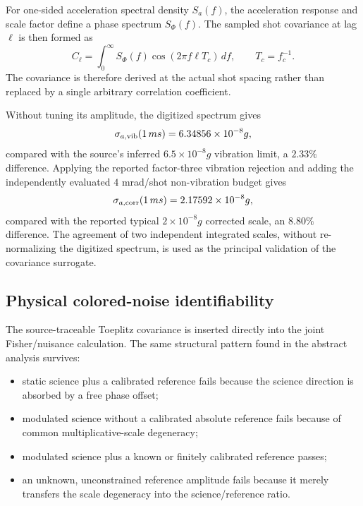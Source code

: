For one-sided acceleration spectral density $S_a(f)$, the acceleration response and scale factor define a phase spectrum $S_\Phi(f)$. The sampled shot covariance at lag $\ell$ is then formed as
\begin{equation}
C_\ell=\int_0^{\infty}S_\Phi(f)
\cos(2\pi f\ell T_c)\,df,
\qquad T_c=f_c^{-1}.
\label{eq:covariance}
\end{equation}
The covariance is therefore derived at the actual shot spacing rather than replaced by a single arbitrary correlation coefficient.

Without tuning its amplitude, the digitized spectrum gives
\begin{equation}
\sigma_{a,\rm vib}(1\,{
m s})=6.34856\times10^{-8}g,
\end{equation}
compared with the source's inferred $6.5\times10^{-8}g$ vibration limit, a $2.33\%$ difference. Applying the reported factor-three vibration rejection and adding the independently evaluated $4$ mrad/shot non-vibration budget gives
\begin{equation}
\sigma_{a,\rm corr}(1\,{
m s})=2.17592\times10^{-8}g,
\end{equation}
compared with the reported typical $2\times10^{-8}g$ corrected scale, an $8.80\%$ difference. The agreement of two independent integrated scales, without re-normalizing the digitized spectrum, is used as the principal validation of the covariance surrogate.

\subsection{Physical colored-noise identifiability}

The source-traceable Toeplitz covariance is inserted directly into the joint Fisher/nuisance calculation. The same structural pattern found in the abstract analysis survives:
\begin{itemize}
\item static science plus a calibrated reference fails because the science direction is absorbed by a free phase offset;
\item modulated science without a calibrated absolute reference fails because of common multiplicative-scale degeneracy;
\item modulated science plus a known or finitely calibrated reference passes;
\item an unknown, unconstrained reference amplitude fails because it merely transfers the scale degeneracy into the science/reference ratio.
\end{itemize}

